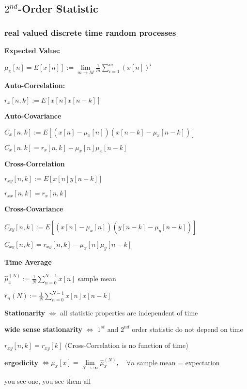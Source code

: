 \newpage
\subsection{\texorpdfstring{$2^{nd}$}{Second}-Order Statistic}

\subsubsection{real valued discrete time random processes}
\textbf{Expected Value:}

\quad $\mu_x[n]=E[x[n]]:= \lim\limits_{m\to M}\frac{1}{m}\sum\limits_{i=1}^m(x[n])^i$

\textbf{Auto-Correlation:}

\quad $r_x[n,k]:=E[x[n]x[n-k]]$

\textbf{Auto-Covariance}

\quad $C_x[n,k]:=E[(x[n]-\mu_x[n])(x[n-k]-\mu_x[n-k])]$ 

\quad $C_x[n,k]=r_x[n,k]-\mu_x[n]\mu_x[n-k]$

\textbf{Cross-Correlation}

\quad $r_{xy}[n,k]:=E[x[n]y[n-k]]$

\quad $r_{xx}[n,k]=r_x[n,k]$

\textbf{Cross-Covariance}

\quad $C_{xy}[n,k]:=E[(x[n]-\mu_x[n])(y[n-k]-\mu_y[n-k])] $

\quad $C_{xy}[n,k]=r_{xy}[n,k]-\mu_x[n]\mu_y[n-k]$

\textbf{Time Average}

\quad $\hat{\mu}_x^{(N)}:=\frac{1}{N}\sum\limits_{n=0}^{N-1}x[n]$ \qquad sample mean

\quad $\hat{r}_n{(N)}:=\frac{1}{N}\sum\limits_{n=0}^{N-1}x[n]x[n-k]$

\textbf{Stationarity} $\iff$ all statistic properties are independent of time

\textbf{wide sense stationarity} $\iff$ $1^{st}$ and $2^{nd}$ order statistic do not depend on time

\pfeil $r_{xy}[n,k]=r_{xy}[k]$ (Cross-Correlation is no function of time)

\textbf{ergodicity} $\iff \mu_x[x]=\lim\limits_{N\to\infty}\hat{\mu}_x^{(N)},\quad \forall n$ \pfeil sample mean = expectation 

\qquad you see one, you see them all 

\vspace{0.5cm}

